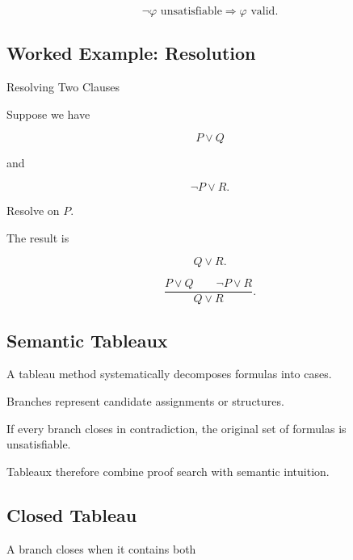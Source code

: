 \[
\boxed{
\neg\varphi
\text{ unsatisfiable}
\Longrightarrow
\varphi
\text{ valid}.
}
\]

\subsection{Worked Example: Resolution}
\label{subsec:worked-resolution}

\begin{workedexamplebox}{Resolving Two Clauses}

Suppose we have

\[
P\lor Q
\]

and

\[
\neg P\lor R.
\]

Resolve on \(P\).

The result is

\[
Q\lor R.
\]

\begin{answerbox}
\[
\boxed{
\frac{
P\lor Q
\qquad
\neg P\lor R
}{
Q\lor R
}.
}
\]
\end{answerbox}

\end{workedexamplebox}

\subsection{Semantic Tableaux}
\label{subsec:semantic-tableaux}

A tableau method systematically decomposes formulas into cases.

Branches represent candidate assignments or structures.

If every branch closes in contradiction, the original set of formulas is
unsatisfiable.

Tableaux therefore combine proof search with semantic intuition.

\subsection{Closed Tableau}
\label{subsec:closed-tableau}

A branch closes when it contains both

